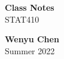\documentclass[11pt,oneside]{book}
\theoremstyle{break}
\theoremstyle{break}
\begin{document}
	\begin{titlepage}
		\begin{center}
			\vspace*{\fill}
			\Huge \color{red}
				\textbf{Class Notes}\\
				\color{black}
			\vspace{0.5cm}			
			\Large 
				STAT410
			\vspace{3cm}

			
			
			\vspace{5cm}
			\LARGE
				\textbf{Wenyu Chen}\\
				\hfill\break
				\LARGE Summer 2022\\
				\color{black}
			\vspace{5cm}

		\vspace*{\fill}
		\author{Wenyu Chen} \date{Summer 2022}
		\end{center}			
	\end{titlepage}
	\newpage
\end{document}
